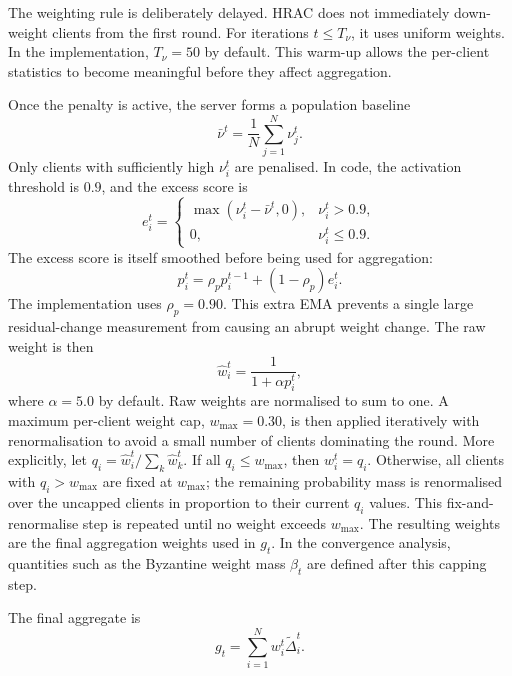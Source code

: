 The weighting rule is deliberately delayed. HRAC does not immediately
down-weight clients from the first round. For
iterations $t \leq T_{\nu}$, it uses uniform weights. In the implementation,
$T_{\nu}=50$ by default. This warm-up allows the per-client statistics to become
meaningful before they affect aggregation.

Once the penalty is active, the server forms a population baseline
\begin{equation}
    \bar{\nu}^t = \frac{1}{N}\sum_{j=1}^{N}\nu_j^t .
\end{equation}
Only clients with sufficiently high $\nu_i^t$ are penalised. In code, the
activation threshold is $0.9$, and the excess score is
\begin{equation}
    e_i^t =
    \begin{cases}
        \max(\nu_i^t-\bar{\nu}^t,0), & \nu_i^t>0.9,\\
        0, & \nu_i^t\leq 0.9 .
    \end{cases}
\end{equation}
The excess score is itself smoothed before being used for aggregation:
\begin{equation}
    p_i^t = \rho_p p_i^{t-1} + (1-\rho_p)e_i^t .
\end{equation}
The implementation uses \(\rho_p=0.90\). This extra EMA prevents a single
large residual-change measurement from causing an abrupt weight change.
The raw weight is then
\begin{equation}
    \hat w_i^t = \frac{1}{1+\alpha p_i^t},
\end{equation}
where $\alpha=5.0$ by default. Raw weights are normalised to sum to one. A
maximum per-client weight cap, $w_{\max}=0.30$, is then applied iteratively with
renormalisation to avoid a small number of clients dominating the round.
More explicitly, let \(q_i=\hat w_i^t/\sum_k\hat w_k^t\). If all
\(q_i\le w_{\max}\), then \(w_i^t=q_i\). Otherwise, all clients with
\(q_i>w_{\max}\) are fixed at \(w_{\max}\); the remaining probability mass is
renormalised over the uncapped clients in proportion to their current \(q_i\)
values. This fix-and-renormalise step is repeated until no weight exceeds
\(w_{\max}\). The resulting weights are the final aggregation weights used in
\(g_t\). In the convergence analysis, quantities such as the Byzantine weight
mass \(\beta_t\) are defined after this capping step.

The final aggregate is
\begin{equation}
    g_t = \sum_{i=1}^{N} w_i^t\tilde{\Delta}_i^t .
\end{equation}

